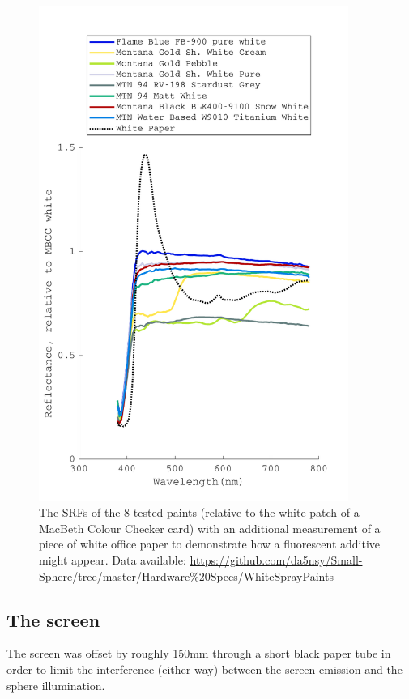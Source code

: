 \begin{figure}[htbp]
\includegraphics[max width=0.9\textwidth,center]{figs/SmallSphere/VisualiseSPDs_result.pdf}
\caption{The \glspl{SRF} of the 8 tested paints (relative to the white patch of a MacBeth Colour Checker card) with an additional measurement of a piece of white office paper to demonstrate how a fluorescent additive might appear. Data available: \url{https://github.com/da5nsy/Small-Sphere/tree/master/Hardware\%20Specs/WhiteSprayPaints}}
\label{fig:spray}
\end{figure}


\subsection{The screen}

The screen was offset by roughly 150mm through a short black paper tube in order to limit the interference (either way) between the screen emission and the sphere illumination. 

